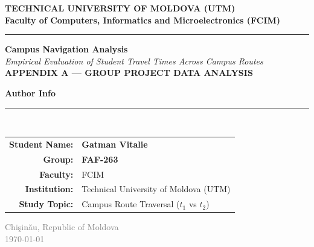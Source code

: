 \documentclass[11pt, a4paper]{article}
\begin{document}
\begin{titlepage}
    \centering
    \vspace*{1cm}
    
    {\Large \textbf{\textcolor{primary}{TECHNICAL UNIVERSITY OF MOLDOVA (UTM)}}} \\[0.4em]
    {\large \textbf{\textcolor{secondary}{Faculty of Computers, Informatics and Microelectronics (FCIM)}}} \\[0.2em]
    \rule{0.85\textwidth}{1.5pt}
    
    \vspace{3.5cm}
    
    {\Huge \bfseries \textcolor{primary}{Campus Navigation Analysis}} \\[1em]
    {\Large \textcolor{secondary}{\textit{Empirical Evaluation of Student Travel Times Across Campus Routes}}} \\[0.5em]
    {\small \textcolor{accent}{\textbf{APPENDIX A --- GROUP PROJECT DATA ANALYSIS}}}
    
    \vspace{4.5cm}
    
    \begin{tcolorbox}[colframe=primary, colback=lightbg, width=0.85\textwidth, arc=6pt]
        \centering
        \vspace{0.3em}
        {\large \textbf{Author Info}} \\[0.5em]
        \rule{0.6\textwidth}{0.5pt} \\[0.6em]
        \begin{tabular}{r l}
            \textbf{Student Name:} & \textbf{Gatman Vitalie} \\
            \textbf{Group:} & \textbf{FAF-263} \\
            \textbf{Faculty:} & FCIM \\
            \textbf{Institution:} & Technical University of Moldova (UTM) \\
            \textbf{Study Topic:} & Campus Route Traversal ($t_1$ vs $t_2$) \\
        \end{tabular}
        \vspace{0.3em}
    \end{tcolorbox}
    
    \vfill
    
    {\small \textcolor{gray}{Chişinău, Republic of Moldova}} \\
    {\small \textcolor{gray}{\today}}
    
\end{titlepage}
\end{document}
